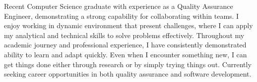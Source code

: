 

\begin{cvparagraph}

Recent Computer Science graduate with experience as a Quality Assurance Engineer, demonstrating a strong capability for collaborating within teams. I enjoy working in dynamic environment that present challenges, where I can apply my analytical and technical skills to solve problems effectively. Throughout my academic journey and professional experience, I have consistently demonstrated ability to learn and adapt quickly. Even when I encounter something new, I can get things done either through research or by simply trying things out. Currently seeking career opportunities in both quality assurance and software development.
\end{cvparagraph}